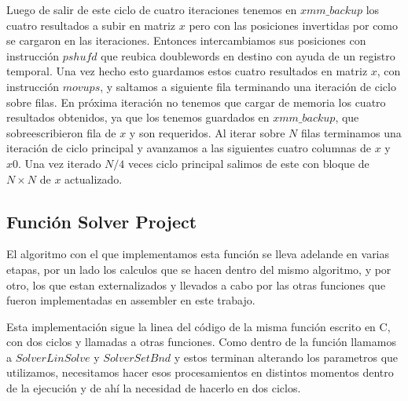 \par Luego de salir de este ciclo de cuatro iteraciones tenemos en $xmm\_backup$ los cuatro resultados a subir en matriz $x$ pero con las posiciones invertidas por como se cargaron en las iteraciones. Entonces intercambiamos sus posiciones con instrucción $pshufd$ que reubica doublewords en destino con ayuda de un registro temporal. Una vez hecho esto guardamos estos cuatro resultados en matriz $x$, con instrucción $movups$, y saltamos a siguiente fila terminando una iteración de ciclo sobre filas. En próxima iteración no tenemos que cargar de memoria los cuatro resultados obtenidos, ya que los tenemos guardados en $xmm\_backup$, que sobreescribieron fila de $x$ y son requeridos. Al iterar sobre $N$ filas terminamos una iteración de ciclo principal y avanzamos a las siguientes cuatro columnas de $x$ y $x0$. Una vez iterado $N/4$ veces ciclo principal salimos de este con bloque de 
$N\times N$ de $x$ actualizado.\newline

\subsection{Función Solver Project}
\par El algoritmo con el que implementamos esta función se lleva adelande en varias etapas, por un lado los calculos que se hacen dentro del mismo algoritmo, y por otro, los que estan externalizados y llevados a cabo por las otras funciones que fueron implementadas en assembler en este trabajo.\newline

\par Esta implementación sigue la linea del código de la misma función escrito en C, con dos ciclos y llamadas a otras funciones. Como dentro de la función llamamos a $Solver Lin Solve$ y $Solver Set Bnd$ y estos terminan alterando los parametros que utilizamos, necesitamos hacer esos procesamientos en distintos momentos dentro de la ejecución y de ahí la necesidad de hacerlo en dos ciclos.\newline

